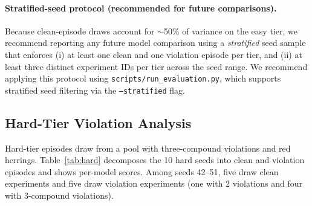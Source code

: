 \documentclass{article}
\begin{document}
\paragraph{Stratified-seed protocol (recommended for future
comparisons).}
Because clean-episode draws account for $\sim$50\% of variance on the
easy tier, we recommend reporting any future model comparison using a
\emph{stratified} seed sample that enforces (i) at least one clean and
one violation episode per tier, and (ii) at least three distinct
experiment IDs per tier across the seed range.
We recommend applying this protocol using \texttt{scripts/run\_evaluation.py},
which supports stratified seed filtering via the \texttt{--stratified} flag.

\subsection{Hard-Tier Violation Analysis}
\label{sec:hardanalysis}

Hard-tier episodes draw from a pool with three-compound violations and red
herrings.  Table~\ref{tab:hard} decomposes the 10 hard seeds into clean
and violation episodes and shows per-model scores.  Among seeds 42--51, five
draw clean experiments and five draw violation experiments (one with 2
violations and four with 3-compound violations).
\end{document}
